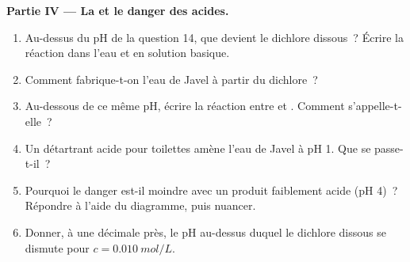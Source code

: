 \begin{problem}
\medskip
\noindent\textbf{Partie IV --- La  et le danger des acides.}
\begin{enumerate}[resume]
  \item Au-dessus du pH de la question 14, que devient le dichlore
        dissous~? Écrire la réaction dans l'eau et en solution basique.
  \item Comment fabrique-t-on l'eau de Javel à partir du dichlore~?
  \item Au-dessous de ce même pH, écrire la réaction entre  et
        . Comment s'appelle-t-elle~?
  \item Un détartrant acide pour toilettes amène l'eau de Javel à pH 1.
        Que se passe-t-il~?
  \item Pourquoi le danger est-il moindre avec un produit faiblement
        acide (pH 4)~? Répondre à l'aide du diagramme, puis nuancer.
  \item Donner, à une décimale près, le pH au-dessus duquel le dichlore
        dissous se dismute pour $c = \qty{0.010}{mol/L}$.
\end{enumerate}
\end{problem}
